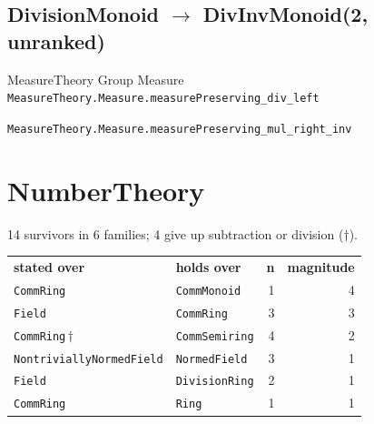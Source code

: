\documentclass[10pt,a4paper]{article}
\begin{document}
\subsection*{DivisionMonoid $\to$ DivInvMonoid\quad\textmd{\small (2, unranked)}}
{\footnotesize\color{locator}MeasureTheory\,\textperiodcentered\,Group\,\textperiodcentered\,Measure}\\
\hspace*{1em}\texttt{\small MeasureTheory.\allowbreak{}Measure.\allowbreak{}measurePreserving\_div\_left}\\

\hspace*{1em}\texttt{\small MeasureTheory.\allowbreak{}Measure.\allowbreak{}measurePreserving\_mul\_right\_inv}\\

\clearpage
\section{NumberTheory}
14 survivors in 6 families; 4 give up subtraction or division ($\dagger$).

\begin{center}
\begin{tabular}{llrr}
\textbf{stated over} & \textbf{holds over} & \textbf{n} & \textbf{magnitude}\\[2pt]
\texttt{\small CommRing} & \texttt{\small CommMonoid} & 1 & 4\\
\texttt{\small Field} & \texttt{\small CommRing} & 3 & 3\\
\texttt{\small CommRing}\,$\dagger$ & \texttt{\small CommSemiring} & 4 & 2\\
\texttt{\small NontriviallyNormedField} & \texttt{\small NormedField} & 3 & 1\\
\texttt{\small Field} & \texttt{\small DivisionRing} & 2 & 1\\
\texttt{\small CommRing} & \texttt{\small Ring} & 1 & 1\\
\end{tabular}
\end{center}
\end{document}
